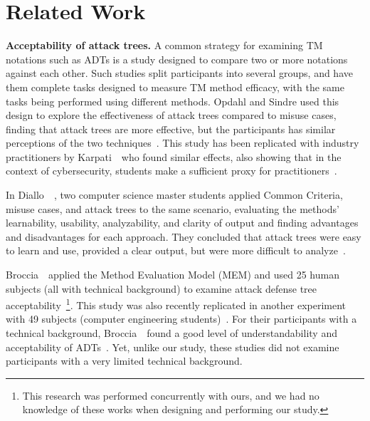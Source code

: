 
\section{Related Work}\label{sec:empirical_studies}


\textbf{Acceptability of attack trees.}
A common strategy for examining TM notations such as ADTs is a study designed to compare two or more notations against each other. Such studies split participants into several groups, and have them complete tasks designed to measure TM method efficacy, with the same tasks being performed using different methods. Opdahl and Sindre used this design to explore the effectiveness of attack trees compared to misuse cases, finding that attack trees are more effective, but the participants has similar perceptions of the two techniques~\cite{opdahlExperimentalComparisonAttack2009}. This study has been replicated with industry practitioners by Karpati~\etal\ who found similar effects, also showing that in the context of cybersecurity, students make a sufficient proxy for practitioners~\cite{karpatiComparingAttackTrees2014}. 

In Diallo~\etal~\cite{dialloComparativeEvaluationThree2006}, two computer science master students applied Common Criteria, misuse cases, and attack trees to the same scenario, evaluating the methods' learnability, usability, analyzability, and clarity of output and finding advantages and disadvantages for each approach. They concluded that attack trees were easy to learn and use, provided a clear output, but were more difficult to analyze~\cite{dialloComparativeEvaluationThree2006}.  %


Broccia~\etal\ applied the Method Evaluation Model (MEM) and used 25 human subjects (all with technical background) to examine attack defense tree acceptability~\cite{broccia_assessing_2024}\footnote{This research was performed concurrently with ours, and we had no knowledge of these works when designing and performing our study.}. This study was also recently replicated in another experiment with 49 subjects (computer engineering students)~\cite{broccia2025evaluating}. For their participants with a technical background, Broccia~\etal\ found a good level of understandability and acceptability of ADTs~\cite{broccia_assessing_2024,broccia2025evaluating}. Yet, unlike our study, these studies did not examine participants with a very limited technical background. 


